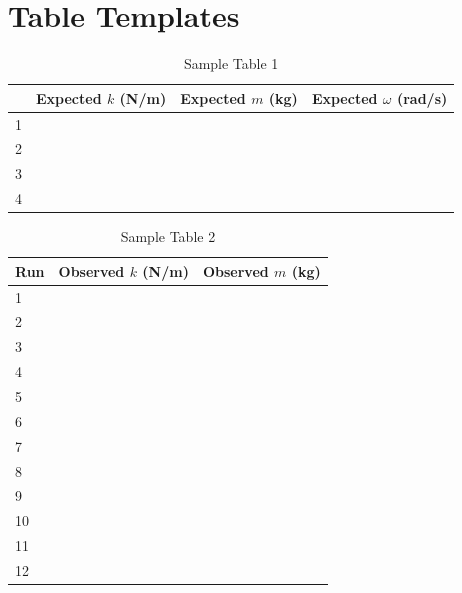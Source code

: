 \section{Table Templates}
%
\begin{table}[ht!]
    \begin{center}
        \begin{tabular}{l|l|l|l}
            & Expected $k$ (N/m) & Expected $m$ (kg) & Expected $\omega$ (rad/s) \\
            \hline
            1 & & & \\
            2 & & & \\
            3 & & & \\
            4 & & & \\
            \hline
        \end{tabular}
    \end{center}
    \caption{Sample Table 1}
\end{table}
%
\begin{table}[ht!]
    \begin{center}
        \begin{tabular}{l|l|l}
            \textbf{Run} & Observed $k$ (N/m) & Observed $m$ (kg) \\
            \hline
            1 & & \\
            2 & & \\
            3 & & \\
            \hline
            4 & & \\
            5 & & \\
            6 & & \\
            \hline
            7 & & \\
            8 & & \\
            9 & & \\
            \hline
            10 & & \\
            11 & & \\
            12 & & \\
            \hline
        \end{tabular}
    \end{center}
    \caption{Sample Table 2}
\end{table}
%
\newpage
